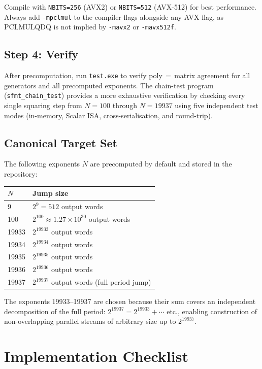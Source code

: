 \documentclass{article}
\begin{document}
Compile with \texttt{NBITS=256} (AVX2) or \texttt{NBITS=512} (AVX-512) for best
performance.  Always add \texttt{-mpclmul} to the compiler flags alongside any AVX flag,
as PCLMULQDQ is not implied by \texttt{-mavx2} or \texttt{-mavx512f}.

\subsection{Step 4: Verify}

After precomputation, run \texttt{test.exe} to verify poly\,$=$\,matrix agreement for all
generators and all precomputed exponents.  The chain-test program
(\texttt{sfmt\_chain\_test}) provides a more exhaustive verification by checking every
single squaring step from $N=100$ through $N=19937$ using five independent test modes
(in-memory, Scalar ISA, cross-serialisation, and round-trip).

\subsection{Canonical Target Set}

The following exponents $N$ are precomputed by default and stored in the repository:

\begin{center}
\begin{tabular}{ll}
\toprule
$N$ & Jump size \\
\midrule
9      & $2^9 = 512$ output words \\
100    & $2^{100} \approx 1.27 \times 10^{30}$ output words \\
19933  & $2^{19933}$ output words \\
19934  & $2^{19934}$ output words \\
19935  & $2^{19935}$ output words \\
19936  & $2^{19936}$ output words \\
19937  & $2^{19937}$ output words (full period jump) \\
\bottomrule
\end{tabular}
\end{center}

The exponents 19933--19937 are chosen because their sum covers an independent
decomposition of the full period: $2^{19937} = 2^{19933} + \cdots$ etc., enabling
construction of non-overlapping parallel streams of arbitrary size up to $2^{19937}$.

\section{Implementation Checklist}
\end{document}
